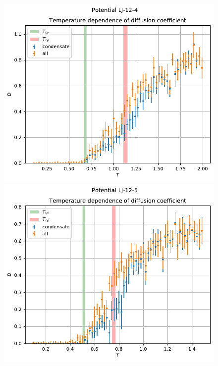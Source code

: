\documentclass[pdf,hyperref={unicode}]{beamer}
\begin{document}
\begin{frame}
\transdissolve[duration=0.2]

\begin{figure}[h]
\begin{center}
\begin{minipage}[h]{0.35\linewidth}
\includegraphics[width=\textwidth, keepaspectratio]{plot_diffusion_Potential LJ-12-4_1}
\end{minipage}
\begin{minipage}[h]{0.35\linewidth}
\includegraphics[width=\textwidth, keepaspectratio]{plot_diffusion_Potential LJ-12-5_1}

\end{minipage}
\end{center}
\end{figure}
\end{frame}
\end{document}
